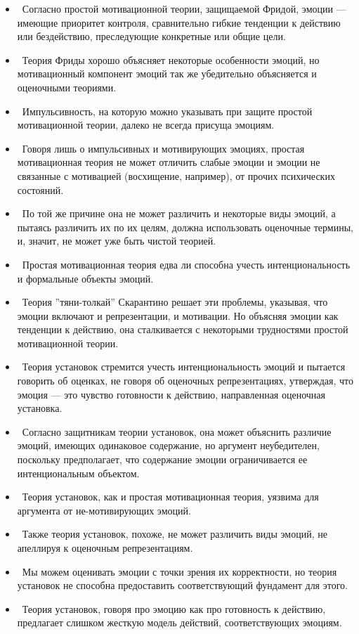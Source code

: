 \documentclass[11pt]{book}
\begin{document}
\begin{itemize}
  \item\ Согласно простой мотивационной теории, защищаемой Фридой, эмоции --- имеющие приоритет контроля, сравнительно гибкие тенденции к действию или бездействию, преследующие конкретные или общие цели.
  \item\ Теория Фриды хорошо объясняет некоторые особенности эмоций, но мотивационный компонент эмоций так же убедительно объясняется и оценочными теориями.
  \item\ Импульсивность, на которую можно указывать при защите простой мотивационной теории, далеко не всегда присуща эмоциям.
  \item\ Говоря лишь о импульсивных и мотивирующих эмоциях, простая мотивационная теория не может отличить слабые эмоции и эмоции не связанные с мотивацией (восхищение, например), от прочих психических состояний.
  \item\ По той же причине она не может различить и некоторые виды эмоций, а пытаясь различить их по их целям, должна использовать оценочные термины, и, значит, не может уже быть чистой теорией.
  \item\ Простая мотивационная теория едва ли способна учесть интенциональность и формальные объекты эмоций.
  \item\ Теория ''тяни-толкай'' Скарантино решает эти проблемы, указывая, что эмоции включают и репрезентации, и мотивации. Но объясняя эмоции как тенденции к действию, она сталкивается с некоторыми трудностями простой мотивационной теории.
  \item\ Теория установок стремится учесть интенциональность эмоций и пытается говорить об оценках, не говоря об оценочных репрезентациях, утверждая, что эмоция --- это чувство готовности к действию, направленная оценочная установка.
  \item\ Согласно защитникам теории установок, она может объяснить различие эмоций, имеющих одинаковое содержание, но аргумент неубедителен, поскольку предполагает, что содержание эмоции ограничивается ее интенциональным объектом.
  \item\ Теория установок, как и простая мотивационная теория, уязвима для аргумента от не-мотивирующих эмоций.
  \item\ Также теория установок, похоже, не может различить виды эмоций, не апеллируя к оценочным репрезентациям.
  \item\ Мы можем оценивать эмоции с точки зрения их корректности, но теория установок не способна предоставить соответствующий фундамент для этого.
  \item\ Теория установок, говоря про эмоцию как про готовность к действию, предлагает слишком жесткую модель действий, соответствующих эмоциям.
\end{itemize}
\end{document}

